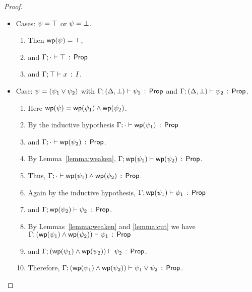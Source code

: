\documentclass[10pt,a4paper]{article}
\begin{document}
\begin{proof}
\begin{itemize}
  \item Cases: $\psi = \top$ or $\psi = \bot$.
      \begin{enumerate}
      \item 
      	Then $\mathop{\mathsf{wp}}(\psi) = \top$,
      \item
        and $\Gamma;\cdot \vdash \top\, :\, \mathsf{Prop}$ 
      \item
        and $\Gamma;\top \vdash x\, :\, I$.
      \end{enumerate}
      
  \item Case: $\psi = (\psi_1 \vee \psi_2)$ with
       $\Gamma;(\Delta,\bot) \vdash \psi_1\, :\, \mathsf{Prop}$ and 
              $\Gamma;(\Delta,\bot) \vdash \psi_2\, :\, \mathsf{Prop}$.
      	\begin{enumerate}
		\item
			Here $\mathop{\mathsf{wp}}(\psi) = \mathop{\mathsf{wp}}(\psi_1) \wedge \mathop{\mathsf{wp}}(\psi_2)$.
		\item
			By the inductive hypothesis
			$\Gamma;\cdot \vdash \mathop{\mathsf{wp}}(\psi_1)\, :\, \mathsf{Prop}$
		\item	
			and $\Gamma;\cdot \vdash \mathop{\mathsf{wp}}(\psi_2)\, :\, \mathsf{Prop}$.
		\item
		    By Lemma~\ref{lemma:weaken},
		    	$\Gamma;\mathop{\mathsf{wp}}(\psi_1) \vdash \mathop{\mathsf{wp}}(\psi_2)\, :\, \mathsf{Prop}$.
		\item
			Thus, 
			$\Gamma;\cdot \vdash \mathop{\mathsf{wp}}(\psi_1) \wedge \mathop{\mathsf{wp}}(\psi_2)\, :\, \mathsf{Prop}$.
		\item
			Again by the inductive hypothesis,
			$\Gamma;\mathop{\mathsf{wp}}(\psi_1) \vdash \psi_1\, :\, \mathsf{Prop}$
		\item
			and
			$\Gamma;\mathop{\mathsf{wp}}(\psi_2) \vdash \psi_2\, :\, \mathsf{Prop}$.
		\item
			By Lemmas~\ref{lemma:weaken} and \ref{lemma:cut} we have
			$\Gamma;(\mathop{\mathsf{wp}}(\psi_1) \wedge \mathop{\mathsf{wp}}(\psi_2)) \vdash \psi_1\, :\, \mathsf{Prop}$
		\item
			and
			$\Gamma;(\mathop{\mathsf{wp}}(\psi_1) \wedge \mathop{\mathsf{wp}}(\psi_2)) \vdash \psi_2\, :\, \mathsf{Prop}$.
		\item
			Therefore,
			$\Gamma;(\mathop{\mathsf{wp}}(\psi_1) \wedge \mathop{\mathsf{wp}}(\psi_2)) \vdash \psi_1 \vee \psi_2\, :\, \mathsf{Prop}$.
		\end{enumerate}    
      

\end{itemize}
\end{proof}
\end{document}
